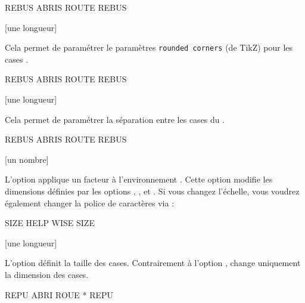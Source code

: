\documentclass[svgnames]{report}
\begin{document}
  \begin{example}
  \begin{GrilleSutom}[Police=\large\ttfamily]{REBUS}
    ABRIS
    ROUTE
    REBUS
  \end{GrilleSutom}
  \end{example}

  [une longueur]

  Cela permet de paramétrer le paramètres \texttt{rounded corners} (de TikZ) pour les cases .

  \begin{example}
  \begin{GrilleSutom}[Arrondi=2.5mm]{REBUS}
    ABRIS
    ROUTE
    REBUS
  \end{GrilleSutom}
  \end{example}

  [une longueur]

  Cela permet de paramétrer la séparation entre les cases du .

  \begin{example}
  \begin{GrilleSutom}[Separation=2mm,CouleurBordures=black]{REBUS}
    ABRIS
    ROUTE
    REBUS
  \end{GrilleSutom}
  \end{example}

  [un nombre]

  L'option  applique un facteur à l'environnement .
  Cette option modifie les dimensions définies par les options ,
  ,  et . Si vous changez l'échelle, vous voudrez également changer la police de caractères via  :

  \begin{example}
  \begin{GrilleSutom}[Echelle=1.5,Police=\huge\bfseries]{SIZE}
     HELP
     WISE
     SIZE
  \end{GrilleSutom}
  \end{example}

  [une longueur]

  L'option  définit la taille des cases. Contrairement à l'option ,  change uniquement la dimension des cases.

  \begin{example}
  \begin{GrilleSutom}[Taille=10mm,Police=\huge\bfseries]{REPU}
     ABRI ROUE * REPU
  \end{GrilleSutom}
  \end{example}
\end{document}
